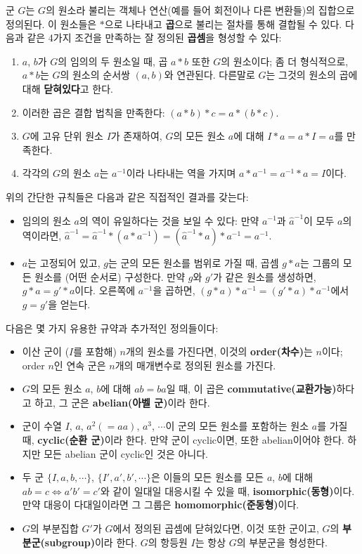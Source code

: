 군 $G$는 $G$의 원소라 불리는 객체나 연산(예를 들어  회전이나 다른 변환들)의 집합으로 정의된다. 이 원소들은 $*$으로 나타내고 \textbf{곱}으로 불리는 절차를 통해 결합될 수 있다. 다음과 같은 4가지 조건을 만족하는 잘 정의된 \textbf{곱셈}을 형성할 수 있다:
\begin{enumerate}
	\item $a$, $b$가 $G$의 임의의 두 원소일 때, 곱 $a * b$ 또한 $G$의 원소이다; 좀 더 형식적으로, $a*b$는 $G$의 원소의 순서쌍 $(a, b)$와 연관된다. 다른말로 $G$는 그것의 원소의 곱에 대해 \textbf{닫혀있다}고 한다.
	\item 이러한 곱은 결합 법칙을 만족한다: $(a*b)*c=a*(b*c)$.
	\item $G$에 고유 단위 원소 $I$가 존재하여, $G$의 모든 원소 $a$에 대해 $I*a = a * I = a$를 만족한다.
	\item 각각의 $G$의 원소 $a$는 $a^{-1}$이라 나타내는 역을 가지며 $a*a^{-1} = a^{-1}*a = I$이다.
\end{enumerate}
위의 간단한 규칙들은 다음과 같은 직접적인 결과를 갖는다:
\begin{itemize}
	\item 임의의 원소 $a$의 역이 유일하다는 것을 보일 수 있다: 만약 $a^{-1}$과 $\hat{a}^{-1}$이 모두 $a$의 역이라면, $\hat{a}^{-1} = \hat{a}^{-1} * (a * a^{-1}) = (\hat{a}^{-1}*a)*a^{-1} = a^{-1}$.
	\item $a$는 고정되어 있고, $g$는 군의 모든 원소를 범위로 가질 때, 곱셈 $g*a$는 그룹의 모든 원소를 (어떤 순서로) 구성한다. 만약 $g$와 $g'$가 같은 원소를 생성하면, $g*a=g'*a$이다. 오른쪽에 $a^{-1}$을 곱하면, $(g*a)*a^{-1} = (g'*a)*a^{-1}$에서 $g=g'$을 얻는다.
\end{itemize}
다음은 몇 가지 유용한 규약과 추가적인 정의들이다:
\begin{itemize}
	\item 이산 군이 ($I$를 포함해) $n$개의 원소를 가진다면, 이것의 \textbf{order(차수)}는 $n$이다; order $n$인 연속 군은 $n$개의 매개변수로 정의된 원소를 가진다.
	\item $G$의 모든 원소 $a$, $b$에 대해 $ab=ba$일 때, 이 곱은 \textbf{commutative(교환가능)}하다고 하고, 그 군은 \textbf{abelian(아벨 군)}이라 한다.
	\item 군이 수열 $I$, $a$, $a^2(=aa)$, $a^3$, $\cdots$이 군의 모든 원소를 포함하는 원소 $a$를 가질 때, \textbf{cyclic(순환 군)}이라 한다. 만약 군이 cyclic이면, 또한 abelian이어야 한다. 하지만 모든 abelian 군이 cyclic인 것은 아니다.
	\item 두 군 $\{ I, a, b, \cdots \}$, $\{ I', a', b', \cdots \}$은 이들의 모든 원소를 모든 $a$, $b$에 대해 $ab=c \Longleftrightarrow a'b'=c'$와 같이 일대일 대응시킬 수 있을 때, \textbf{isomorphic(동형)}이다. 만약 대응이 다대일이라면 그 그룹은 \textbf{homomorphic(준동형)}이다.
	\item $G$의 부분집합 $G'$가 $G$에서 정의된 곱셈에 닫혀있다면, 이것 또한 군이고, $G$의 \textbf{부분군(subgroup)}이라 한다. $G$의 항등원 $I$는 항상 $G$의 부분군을 형성한다.
\end{itemize}
